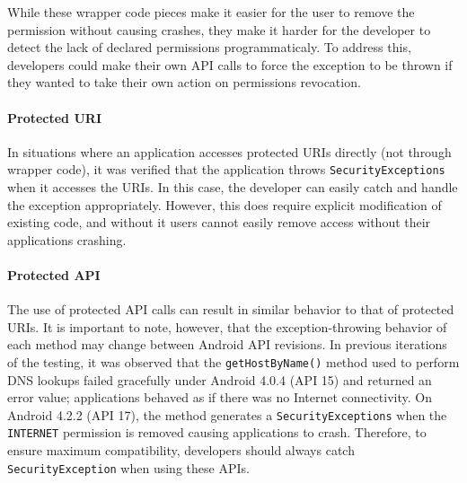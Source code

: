While these wrapper code pieces make it easier for the user to remove the permission without causing crashes, they make it harder for the developer to detect the lack of declared permissions programmaticaly.  To address this, developers could make their own API calls to force the exception to be thrown if they wanted to take their own action on permissions revocation. 

\paragraph{\bfseries Protected URI}
In situations where an application accesses protected URIs directly (not through wrapper code), it was verified that the application throws \texttt{SecurityExceptions} when it accesses the URIs.  In this case, the developer can easily catch and handle the exception appropriately.  However, this does require explicit modification of existing code, and without it users cannot easily remove access without their applications crashing.  

\paragraph{\bfseries Protected API}
The use of protected API calls can result in similar behavior to that of protected URIs.  It is important to note, however, that the exception-throwing behavior of each method may change between Android API revisions.  In previous iterations of the testing, it was observed that the \texttt{getHostByName()} method used to perform DNS lookups failed gracefully under Android 4.0.4 (API 15) and returned an error value; applications behaved as if there was no Internet connectivity.  On Android 4.2.2 (API 17), the method generates a \texttt{SecurityExceptions} when the \texttt{INTERNET} permission is removed causing applications to crash.  Therefore, to ensure maximum compatibility, developers should always catch \texttt{SecurityException} when using these APIs.


